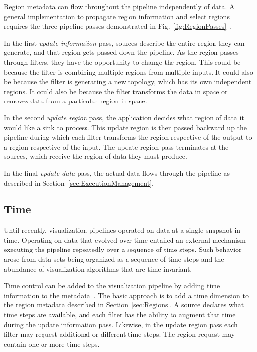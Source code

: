 \documentclass[journal,twocolumn,10pt,letterpaper,twoside]{IEEEtran}
\newcommand*{\lcite}[1]{~\cite{#1}}
\newcommand*{\figref}[1]{Fig.~\ref{#1}}
\newcommand*{\keyterm}[1]{\emph{#1}}
\begin{document}
Region metadata can flow throughout the pipeline independently of data.  A
general implementation to propagate region information and select regions
requires the three pipeline passes demonstrated in
\figref{fig:RegionPasses}\lcite{Ahrens2001}.

In the first \keyterm{update information} pass, sources describe the entire
region they can generate, and that region gets passed down the pipeline.
As the region passes through filters, they have the opportunity to change
the region.  This could be because the filter is combining multiple regions
from multiple inputs.  It could also be because the filter is generating a
new topology, which has its own independent regions.  It could also be
because the filter transforms the data in space or removes data from a
particular region in space.

In the second \keyterm{update region} pass, the application decides what
region of data it would like a sink to process.  This update region is then
passed backward up the pipeline during which each filter transforms the
region respective of the output to a region respective of the input.  The
update region pass terminates at the sources, which receive the region of
data they must produce.

In the final \keyterm{update data} pass, the actual data flows through the
pipeline as described in Section~\ref{sec:ExecutionManagement}.

\subsection{Time}
\label{sec:Time}

Until recently, visualization pipelines operated on data at a single
snapshot in time.  Operating on data that evolved over time entailed an
external mechanism executing the pipeline repeatedly over a sequence of
time steps.  Such behavior arose from data sets being organized as a
sequence of time steps and the abundance of visualization algorithms that
are time invariant.

Time control can be added to the visualization pipeline by adding time
information to the metadata\lcite{Biddiscombe2007}.  The basic approach is
to add a time dimension to the region metadata described in
Section~\ref{sec:Regions}.  A source declares what time steps are
available, and each filter has the ability to augment that time during the
update information pass.  Likewise, in the update region pass each filter
may request additional or different time steps.  The region request may contain
one or more time steps.
\end{document}
